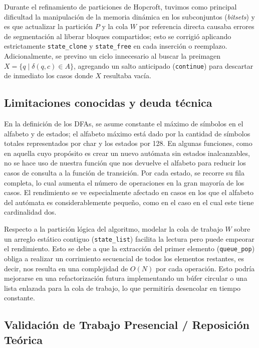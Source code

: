 \documentclass[12pt, letterpaper]{article}
\begin{document}
\noindent Durante el refinamiento de particiones de Hopcroft, tuvimos como principal dificultad la manipulación de la memoria dinámica en los subconjuntos (\textit{bitsets}) y es que actualizar la partición $P$ y la cola $W$ por referencia directa causaba errores de segmentación al liberar bloques compartidos; esto se corrigió aplicando estrictamente \texttt{state\_clone} y \texttt{state\_free} en cada inserción o reemplazo. Adicionalmente, se previno un ciclo innecesario al buscar la preimagen $X = \{q \mid \delta(q,c) \in A\}$, agregando un salto anticipado (\texttt{continue}) para descartar de inmediato los casos donde $X$ resultaba vacía.

\subsection*{Limitaciones conocidas y deuda técnica}
\noindent En la definición de los DFAs, se asume constante el máximo de símbolos en el alfabeto y de estados; el alfabeto máximo está dado por la cantidad de símbolos totales representados por char y los estados por 128. En algunas funciones, como en aquella cuyo propósito es crear un nuevo autómata sin estados inalcanzables, no se hace uso de nuestra función que nos devuelve el alfabeto para reducir los casos de consulta a la función de transición. Por cada estado, se recorre su fila completa, lo cual aumenta el número de operaciones en la gran mayoría de los casos. El rendimiento se ve especialmente afectado en casos en los que el alfabeto del autómata es considerablemente pequeño, como en el caso en el cual este tiene cardinalidad dos. 

\noindent Respecto a la partición lógica del algoritmo, modelar la cola de trabajo $W$ sobre un arreglo estático contiguo (\texttt{state\_list}) facilita la lectura pero puede empeorar el rendimiento. Esto se debe a que la extracción del primer elemento (\texttt{queue\_pop}) obliga a realizar un corrimiento secuencial de todos los elementos restantes, es decir, nos resulta en una complejidad de $O(N)$ por cada operación. Esto podría mejorarse en una refactorización futura implementando un búfer circular o una lista enlazada para la cola de trabajo, lo que permitiría desencolar en tiempo constante.

\newpage
\subsection*{Validación de Trabajo Presencial / Reposición Teórica}
\end{document}
